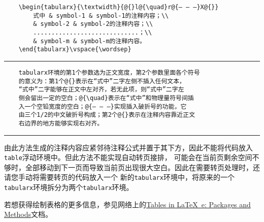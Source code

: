 \begin{verbatim}
	\begin{tabularx}{\textwidth}{@{}l@{\quad}r@{— — —}X@{}}
		式中 & symbol-1 & symbol-1的注释内容；\\
		& symbol-2 & symbol-2的注释内容；\\
		.............................；\\
		& symbol-m & symbol-m的注释内容。
	\end{tabularx}\vspace{\wordsep}
\end{verbatim}

\noindent\hrule

\begin{verbatim}
	tabularx环境的第1个参数选为正文宽度，第2个参数里面各个符号
	的意义为：第1个@{}表示在“式中”二字左侧不插入任何文本，
	“式中”二字能够在正文中左对齐，若无此项，则“式中”二字左
	侧会留出一定的空白；@{\quad}表示在“式中”和物理量符号间插
	入一个空铅宽度的空白；@{— — —}实现插入破折号的功能，它
	由三个1/2的中文破折号构成；第2个@{}表示在注释内容靠近正文
	右边界的地方能够实现右对齐。
\end{verbatim}

\noindent\hrule\vspace{1em}

由此方法生成的注释内容应紧邻待注释公式并置于其下方，因此不能将代码放入\verb|table|浮动环境中。但此方法不能实现自动转页接排，
可能会在当前页剩余空间不够时，全部移动到下一页而导致当前页出现很大空白。因此在需要转页处理时，还请您手动将需要转页的代码放入一个
新的\verb|tabularx|环境中，将原来的一个\verb|tabularx|环境拆分为两个\verb|tabularx|环境。

若想获得绘制表格的更多信息，参见网络上的\href{http://www.tug.org/pracjourn/2007-1/mori/}{Tables in \LaTeX~e: Packages and Methods}文档。